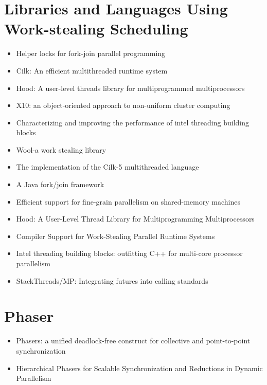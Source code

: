 \section{Libraries and Languages Using Work-stealing Scheduling}
\label{sec:lr-libaries-and-languages-using-work-stealing-scheduling}

\begin{itemize}
\item Helper locks for fork-join parallel programming
  \cite{Agrawal2010}
\item Cilk: An efficient multithreaded runtime system
  \cite{Blumofe1995}
\item Hood: A user-level threads library for multiprogrammed
  multiprocessors \cite{Blumofe1998}
\item X10: an object-oriented approach to non-uniform cluster
  computing \cite{Charles2005}
\item Characterizing and improving the performance of intel threading
  building blocks \cite{Contreras2008}
\item Wool-a work stealing library \cite{Faxen2009}
\item The implementation of the Cilk-5 multithreaded language
  \cite{Frigo1998}
\item A Java fork/join framework \cite{Lea2000}
\item Efficient support for fine-grain parallelism on shared-memory
  machines \cite{Lowenthal1998}
\item Hood: A User-Level Thread Library for Multiprogramming
  Multiprocessors \cite{Papadopoulos1998}
\item Compiler Support for Work-Stealing Parallel Runtime Systems
  \cite{Raman2009}
\item Intel threading building blocks: outfitting C++ for multi-core
  processor parallelism \cite{Reinders2007}
\item StackThreads/MP: Integrating futures into calling standards
  \cite{Taura1999}
\end{itemize}


\section{Phaser}
\label{sec:lr-phaser}

\begin{itemize}
\item Phasers: a unified deadlock-free construct for collective and
  point-to-point synchronization \cite{Shirako2008}
\item Hierarchical Phasers for Scalable Synchronization and Reductions
  in Dynamic Parallelism \cite{Shirako2010}
\end{itemize}


